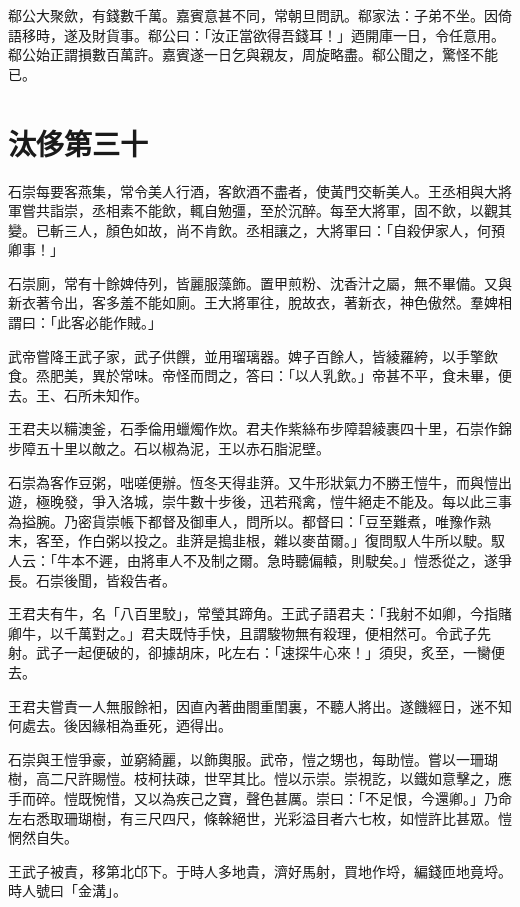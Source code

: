 郗公大聚歛，有錢數千萬。嘉賓意甚不同，常朝旦問訊。郗家法：子弟不坐。因倚語移時，遂及財貨事。郗公曰：「汝正當欲得吾錢耳！」迺開庫一日，令任意用。郗公始正謂損數百萬許。嘉賓遂一日乞與親友，周旋略盡。郗公聞之，驚怪不能已。



\chapter{汰侈第三十}

石崇每要客燕集，常令美人行酒，客飲酒不盡者，使黃門交斬美人。王丞相與大將軍嘗共詣崇，丞相素不能飲，輒自勉彊，至於沉醉。每至大將軍，固不飲，以觀其變。已斬三人，顏色如故，尚不肯飲。丞相讓之，大將軍曰：「自殺伊家人，何預卿事！」

石崇廁，常有十餘婢侍列，皆麗服藻飾。置甲煎粉、沈香汁之屬，無不畢備。又與新衣著令出，客多羞不能如廁。王大將軍往，脫故衣，著新衣，神色傲然。羣婢相謂曰：「此客必能作賊。」

武帝嘗降王武子家，武子供饌，並用瑠璃器。婢子百餘人，皆綾羅絝，以手擎飲食。烝肥美，異於常味。帝怪而問之，答曰：「以人乳飲。」帝甚不平，食未畢，便去。王、石所未知作。

王君夫以糒澳釜，石季倫用蠟燭作炊。君夫作紫絲布步障碧綾裹四十里，石崇作錦步障五十里以敵之。石以椒為泥，王以赤石脂泥壁。

石崇為客作豆粥，咄嗟便辦。恆冬天得韭蓱。又牛形狀氣力不勝王愷牛，而與愷出遊，極晚發，爭入洛城，崇牛數十步後，迅若飛禽，愷牛絕走不能及。每以此三事為搤腕。乃密貨崇帳下都督及御車人，問所以。都督曰：「豆至難煮，唯豫作熟末，客至，作白粥以投之。韭蓱是搗韭根，雜以麥苗爾。」復問馭人牛所以駛。馭人云：「牛本不遲，由將車人不及制之爾。急時聽偏轅，則駛矣。」愷悉從之，遂爭長。石崇後聞，皆殺告者。

王君夫有牛，名「八百里駮」，常瑩其蹄角。王武子語君夫：「我射不如卿，今指賭卿牛，以千萬對之。」君夫既恃手快，且謂駿物無有殺理，便相然可。令武子先射。武子一起便破的，卻據胡床，叱左右：「速探牛心來！」須臾，炙至，一臠便去。

王君夫嘗責一人無服餘衵，因直內著曲閤重閨裏，不聽人將出。遂饑經日，迷不知何處去。後因緣相為垂死，迺得出。

石崇與王愷爭豪，並窮綺麗，以飾輿服。武帝，愷之甥也，每助愷。嘗以一珊瑚樹，高二尺許賜愷。枝柯扶疎，世罕其比。愷以示崇。崇視訖，以鐵如意擊之，應手而碎。愷既惋惜，又以為疾己之寶，聲色甚厲。崇曰：「不足恨，今還卿。」乃命左右悉取珊瑚樹，有三尺四尺，條榦絕世，光彩溢目者六七枚，如愷許比甚眾。愷惘然自失。

王武子被責，移第北邙下。于時人多地貴，濟好馬射，買地作埒，編錢匝地竟埒。時人號曰「金溝」。

